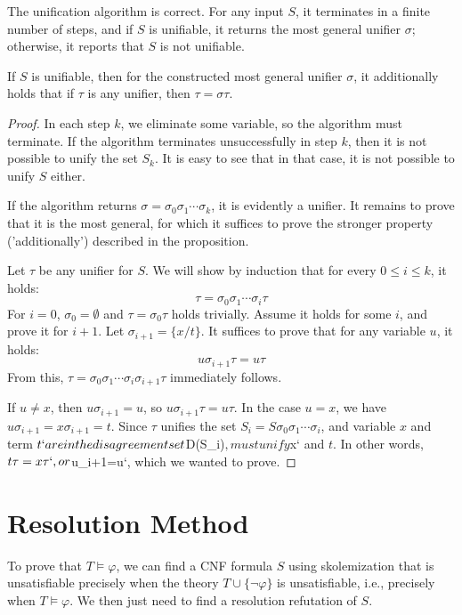 \begin{proposition}\label{proposition:unification-algorithm}
The unification algorithm is correct. For any input $S$, it terminates in a finite number of steps, and if $S$ is unifiable, it returns the most general unifier $\sigma$; otherwise, it reports that $S$ is not unifiable.

If $S$ is unifiable, then for the constructed most general unifier $\sigma$, it additionally holds that if $\tau$ is any unifier, then $\tau=\sigma\tau$.
\end{proposition}
\begin{proof}
In each step $k$, we eliminate some variable, so the algorithm must terminate. If the algorithm terminates unsuccessfully in step $k$, then it is not possible to unify the set $S_k$. It is easy to see that in that case, it is not possible to unify $S$ either.

If the algorithm returns $\sigma=\sigma_0\sigma_1\cdots\sigma_k$, it is evidently a unifier. It remains to prove that it is the most general, for which it suffices to prove the stronger property ('additionally') described in the proposition.

Let $\tau$ be any unifier for $S$. We will show by induction that for every $0\leq i\leq k$, it holds:
$$
\tau=\sigma_0\sigma_1\cdots\sigma_i\tau
$$
For $i=0$, $\sigma_0=\emptyset$ and $\tau=\sigma_0\tau$ holds trivially. Assume it holds for some $i$, and prove it for $i+1$. Let $\sigma_{i+1}=\{x/t\}$. It suffices to prove that for any variable $u$, it holds: 
$$
u\sigma_{i+1}\tau=u\tau
$$
From this, $\tau=\sigma_0\sigma_1\cdots\sigma_i\sigma_{i+1}\tau$ immediately follows.

If $u\neq x$, then $u\sigma_{i+1}=u$, so $u\sigma_{i+1}\tau=u\tau$. In the case $u=x$, we have $u\sigma_{i+1}=x\sigma_{i+1}=t$. Since $\tau$ unifies the set $S_i=S\sigma_0\sigma_1\cdots\sigma_i$, and variable $x$ and term $t` are in the disagreement set $D(S_i)$, $\tau$ must unify $x` and $t$. In other words, $t\tau=x\tau`, or $u\sigma_{i+1}\tau=u\tau`, which we wanted to prove.
\end{proof}

\section{Resolution Method}\label{section:predicate-resolution-method}

To prove that $T\models\varphi$, we can find a CNF formula $S$ using skolemization that is unsatisfiable precisely when the theory $T\cup\{\neg\varphi\}$ is unsatisfiable, i.e., precisely when $T\models\varphi$. We then just need to find a resolution refutation of $S$.

